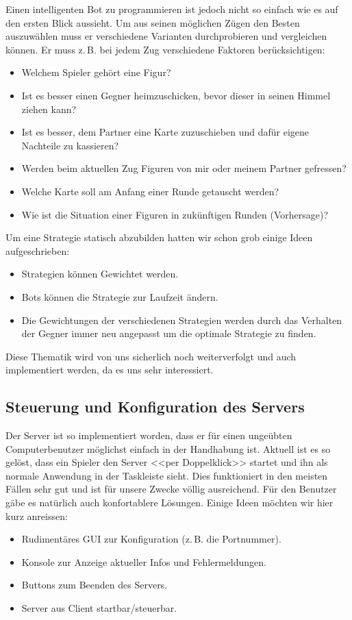 \documentclass[12pt,halfparskip]{scrartcl}
\begin{document}
Einen intelligenten Bot zu programmieren ist jedoch nicht so einfach wie es auf den ersten Blick aussieht. Um aus seinen möglichen Zügen den Besten auszuwählen muss er verschiedene Varianten durchprobieren und vergleichen können. Er muss z.\,B. bei jedem Zug verschiedene Faktoren berücksichtigen:
\begin{itemize}
	\item Welchem Spieler gehört eine Figur?
	\item Ist es besser einen Gegner heimzuschicken, bevor dieser in seinen Himmel ziehen kann?
	\item Ist es besser, dem Partner eine Karte zuzuschieben und dafür eigene Nachteile zu kassieren?
	\item Werden beim aktuellen Zug Figuren von mir oder meinem Partner gefressen?
	\item Welche Karte soll am Anfang einer Runde getauscht werden?
	\item Wie ist die Situation einer Figuren in zukünftigen Runden (Vorhersage)?
\end{itemize}

Um eine Strategie statisch abzubilden hatten wir schon grob einige Ideen aufgeschrieben:
\begin{itemize}
	\item Strategien können Gewichtet werden.
	\item Bots können die Strategie zur Laufzeit ändern.
	\item Die Gewichtungen der verschiedenen Strategien werden durch das Verhalten der Gegner immer neu angepasst um die optimale Strategie zu finden.
\end{itemize}

Diese Thematik wird von uns sicherlich noch weiterverfolgt und auch implementiert werden, da es uns sehr interessiert.

\subsection{Steuerung und Konfiguration des Servers}
Der Server ist so implementiert worden, dass er für einen ungeübten Computerbenutzer möglichst einfach in der Handhabung ist. Aktuell ist es so gelöst, dass ein Spieler den Server <<per Doppelklick>> startet und ihn als normale Anwendung in der Taskleiste sieht. Dies funktioniert in den meisten Fällen sehr gut und ist für unsere Zwecke völlig ausreichend. Für den Benutzer gäbe es natürlich auch konfortablere Lösungen. Einige Ideen möchten wir hier kurz anreissen:
\begin{itemize}
	\item Rudimentäres GUI zur Konfiguration (z.\,B. die Portnummer).
	\item Konsole zur Anzeige aktueller Infos und Fehlermeldungen.
	\item Buttons zum Beenden des Servers.
	\item Server aus Client startbar/steuerbar.
\end{itemize}
\end{document}
